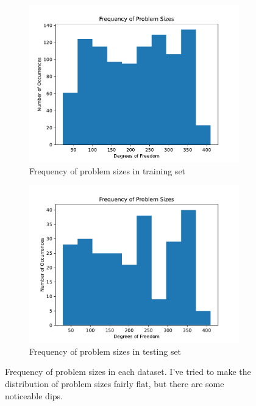 \documentclass{article}
\begin{document}
\begin{figure}[h]
  \centering
  \begin{subfigure}[t]{0.49\textwidth}
    \centering
    \includegraphics[width=\textwidth]{hist_train.pdf}
    \caption{Frequency of problem sizes in training set}
  \end{subfigure}
  \begin{subfigure}[t]{0.49\textwidth}
    \centering
    \includegraphics[width=\textwidth]{hist_test.pdf}
    \caption{Frequency of problem sizes in testing set}
  \end{subfigure}
  \caption{Frequency of problem sizes in each dataset.  I've tried to make the distribution of problem sizes fairly flat, but there are some noticeable dips.}
  \label{fig:histograms}
\end{figure}
\end{document}
